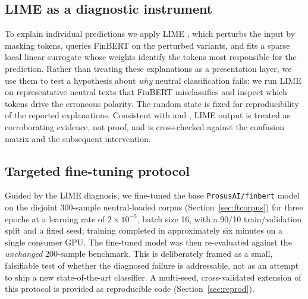 \documentclass[12pt,a4paper]{article}
\begin{document}
\subsection{LIME as a diagnostic instrument}\label{sec:limemethod}
To explain individual predictions we apply LIME \citep{ribeiro2016}, which perturbs
the input by masking tokens, queries FinBERT on the perturbed variants, and fits a
sparse local linear surrogate whose weights identify the tokens most responsible for
the prediction. Rather than treating these explanations as a presentation layer, we
use them to test a hypothesis about \emph{why} neutral classification fails: we run
LIME on representative neutral texts that FinBERT misclassifies and inspect which
tokens drive the erroneous polarity. The random state is fixed for reproducibility
of the reported explanations. Consistent with \citet{slack2020} and \citet{rudin2019},
LIME output is treated as corroborating evidence, not proof, and is cross-checked
against the confusion matrix and the subsequent intervention.

\subsection{Targeted fine-tuning protocol}\label{sec:ftmethod}
Guided by the LIME diagnosis, we fine-tuned the base \texttt{ProsusAI/finbert} model
on the disjoint 300-sample neutral-loaded corpus (Section~\ref{sec:ftcorpus}) for
three epochs at a learning rate of $2\times10^{-5}$, batch size 16, with a 90/10
train/validation split and a fixed seed; training completed in approximately six
minutes on a single consumer GPU. The fine-tuned model was then re-evaluated against
the \emph{unchanged} 200-sample benchmark. This is deliberately framed as a small,
falsifiable test of whether the diagnosed failure is addressable, not as an attempt
to ship a new state-of-the-art classifier. A multi-seed, cross-validated extension
of this protocol is provided as reproducible code (Section~\ref{sec:reprod}).
\end{document}
